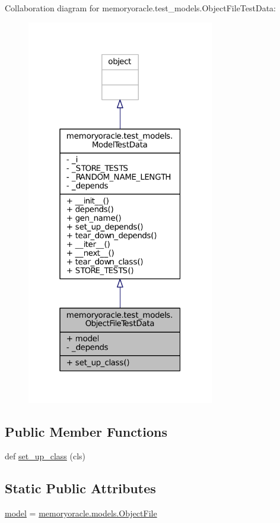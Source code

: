 Collaboration diagram for memoryoracle.\+test\+\_\+models.\+Object\+File\+Test\+Data\+:\nopagebreak
\begin{figure}[H]
\begin{center}
\leavevmode
\includegraphics[width=232pt]{classmemoryoracle_1_1test__models_1_1ObjectFileTestData__coll__graph}
\end{center}
\end{figure}
\subsection*{Public Member Functions}
\begin{DoxyCompactItemize}
\item 
def \hyperlink{classmemoryoracle_1_1test__models_1_1ObjectFileTestData_adf4fa9da652e3a9b4370825ca725231f}{set\+\_\+up\+\_\+class} (cls)
\end{DoxyCompactItemize}
\subsection*{Static Public Attributes}
\begin{DoxyCompactItemize}
\item 
\hyperlink{classmemoryoracle_1_1test__models_1_1ObjectFileTestData_ab61a7fbd6465c4e2d803c81199ab677b}{model} = \hyperlink{classmemoryoracle_1_1models_1_1ObjectFile}{memoryoracle.\+models.\+Object\+File}
\end{DoxyCompactItemize}
